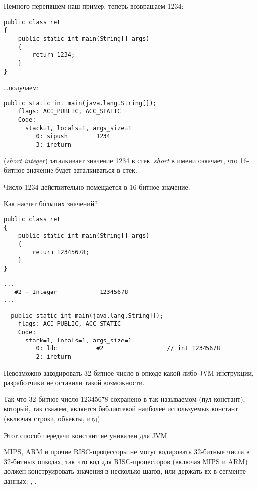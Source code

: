 Немного перепишем наш пример, теперь возвращаем 1234:

\begin{lstlisting}[style=customjava]
public class ret
{
	public static int main(String[] args)
	{
		return 1234;
	}
}
\end{lstlisting}

\dots получаем:

\begin{lstlisting}[caption=JDK 1.7 (excerpt)]
  public static int main(java.lang.String[]);
    flags: ACC_PUBLIC, ACC_STATIC
    Code:
      stack=1, locals=1, args_size=1
         0: sipush        1234
         3: ireturn       
\end{lstlisting}

 (\emph{short integer}) заталкивает значение 1234 в стек.
\emph{short} в имени означает, что 16-битное значение будет заталкиваться в стек. 

Число 1234 действительно помещается в 16-битное значение.

Как насчет б\'{о}льших значений?

\begin{lstlisting}[style=customjava]
public class ret
{
	public static int main(String[] args) 
	{
		return 12345678;
	}
}
\end{lstlisting}

\begin{lstlisting}[caption=Constant pool]
...
   #2 = Integer            12345678
...
\end{lstlisting}

\begin{lstlisting}
  public static int main(java.lang.String[]);
    flags: ACC_PUBLIC, ACC_STATIC
    Code:
      stack=1, locals=1, args_size=1
         0: ldc           #2                  // int 12345678
         2: ireturn       
\end{lstlisting}

Невозможно закодировать 32-битное число в опкоде какой-либо JVM-инструкции, 
разработчики не оставили такой возможности.

Так что 32-битное число 12345678 сохранено в так называемом  (пул констант),
который, так скажем, является библиотекой наиболее используемых констант (включая строки, объекты,
итд).

Этот способ передачи констант не уникален для JVM.

MIPS, ARM и прочие RISC-процессоры не могут кодировать 32-битные числа в 32-битных опкодах,
так что код для RISC-процессоров (включая MIPS и ARM) должен конструировать значения 
в несколько шагов, или держать их в сегменте данных:
, .

